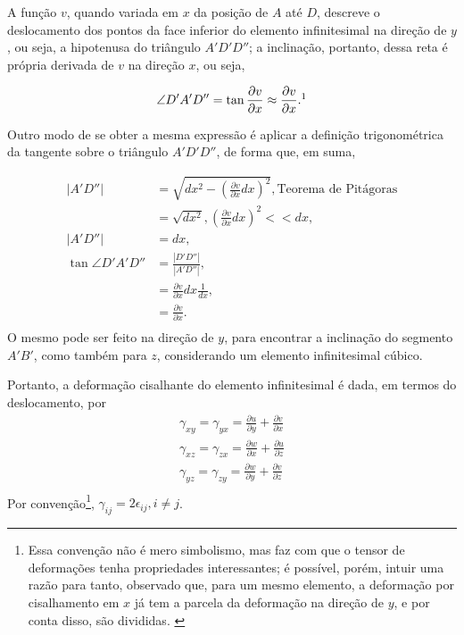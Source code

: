 A função $v$, quando variada em $x$ da posição de $A$ até $D$, descreve o deslocamento dos pontos da face inferior do elemento infinitesimal na direção de $y$, ou seja, a hipotenusa do triângulo $A'D'D''$; a inclinação, portanto, dessa reta é própria derivada de $v$ na direção $x$, ou seja,

\begin{equation}
    \angle D'A'D'' = \tan{\frac{\partial v}{\partial x}} \approx \frac{\partial v}{\partial x}.\footnotemark
\end{equation}

Outro modo de se obter a mesma expressão é aplicar a definição trigonométrica da tangente sobre o triângulo $A'D'D''$, de forma que, em suma,

\begin{align}
    |A'D''|             &= \sqrt{dx^2 -  \left(\frac{\partial v}{\partial x}dx\right)^2}, \text{Teorema de Pitágoras}\\
                         &= \sqrt{dx^2}, \left(\frac{\partial v}{\partial x}dx\right)^2 << dx,\\
    |A'D''|              &= dx,\\
    \tan{\angle D'A'D''} &= \frac{|D'D''|}{|A'D''|}, \\
                         &= \frac{\partial v}{\partial x}dx \frac{1}{dx},\\
                         & = \frac{\partial v}{\partial x}.\\
\end{align}
O mesmo pode ser feito na direção de $y$, para encontrar a inclinação do segmento $A'B'$, como também para $z$, considerando um elemento infinitesimal cúbico.

Portanto, a deformação cisalhante do elemento infinitesimal é dada, em termos do deslocamento, por
\begin{gather}
        \gamma_{xy} = \gamma_{yx} = \frac{\partial u}{\partial y} + \frac{\partial v}{\partial x} \\
        \gamma_{xz} = \gamma_{zx} = \frac{\partial w}{\partial x} + \frac{\partial u}{\partial z} \\
        \gamma_{yz} = \gamma_{zy} = \frac{\partial w}{\partial y} + \frac{\partial v}{\partial z} \\
\end{gather}
Por convenção\footnote{Essa convenção não é mero simbolismo, mas faz com que o tensor de deformações tenha propriedades interessantes; é possível, porém, intuir uma razão para tanto, observado que, para um mesmo elemento, a deformação por cisalhamento em $x$ já tem a parcela da deformação na direção de $y$, e por conta disso, são divididas. \cite{popov} }, $\gamma_{ij} = 2 \epsilon_{ij}, i \neq j$.\cite{roylance} 


